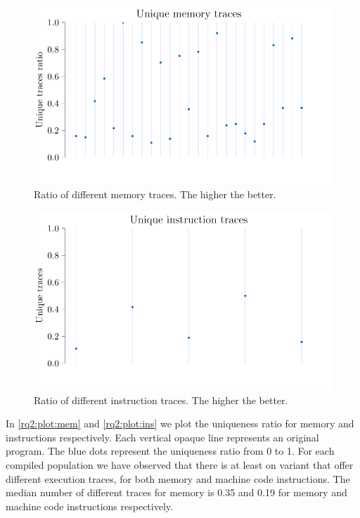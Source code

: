 \documentclass[sigplan,screen]{acmart}
\begin{document}
\begin{figure}
    \centering
    \includegraphics[width=0.8\linewidth]{plots/rq2/memory.pdf}
    \caption{Ratio of different memory traces. The higher the better.}
  \label{rq2:plot:mem}
\end{figure}

\begin{figure}
    \centering
    \includegraphics[width=0.8\linewidth]{plots/rq2/instructions.pdf}
    \caption{Ratio of different instruction traces. The higher the better.}
  \label{rq2:plot:ins}
\end{figure}




In \autoref{rq2:plot:mem} and \autoref{rq2:plot:ins} we plot the uniqueness ratio for memory and instructions respectively.
Each vertical opaque line represents an original program.
The blue dots represent the uniqueness ratio from 0 to 1.
For each compiled population we have observed that there is at least on variant that offer different execution traces, for both memory and machine code instructions.
The median number of different traces for memory is 0.35 and 0.19 for memory and machine code instructions respectively.
\end{document}
